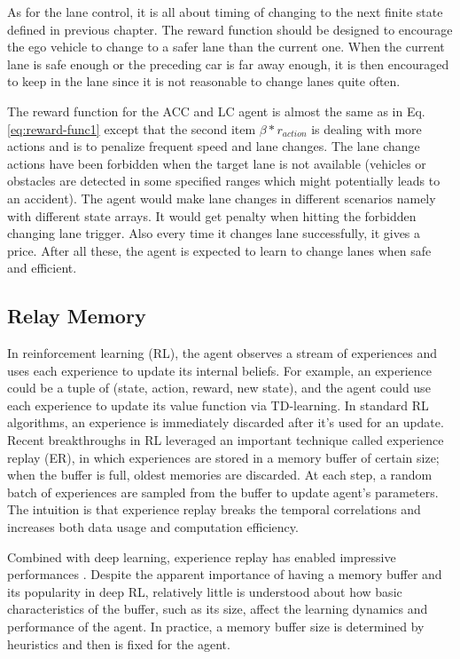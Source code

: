 As for the lane control, it is all about timing of changing to the next finite state defined in previous chapter. The reward function should be designed to encourage the ego vehicle to change to a safer lane than the current one. When the current lane is safe enough or the preceding car is far away enough, it is then encouraged to keep in the lane since it is not reasonable to change lanes quite often.

The reward function for the ACC and LC agent is almost the same as in Eq. \ref{eq:reward-func1} except that the second item $\beta *  r_{action}$ is dealing with more actions and is to penalize frequent speed and lane changes. The lane change actions have been forbidden when the target lane is not available (vehicles or obstacles are detected in some specified ranges which might potentially leads to an accident). The agent would make lane changes in different scenarios namely with different state arrays. It would get penalty when hitting the forbidden changing lane trigger. Also every time it changes lane successfully, it gives a price. After all these, the agent is expected to learn to change lanes when safe and efficient.

\subsection{Relay Memory}

In reinforcement learning (RL), the agent observes a stream of experiences and uses each experience to update its internal beliefs. For example, an experience could be a tuple of (state, action, reward, new state), and the agent could use each experience to update its value function via TD-learning. In standard RL algorithms, an experience is immediately discarded after it's used for an update. Recent breakthroughs in RL leveraged an important technique called experience replay (ER), in which experiences are stored in a memory buffer of certain size; when the buffer is full, oldest memories are discarded. At each step, a random batch of experiences are sampled from the buffer to update agent's parameters. The intuition is that experience replay breaks the temporal correlations and increases both data usage and computation efficiency.

Combined with deep learning, experience replay has enabled impressive performances \cite{Mnih2015AtariNature}. Despite the apparent importance of having a memory buffer and its popularity in deep RL, relatively little is understood about how basic characteristics of the buffer, such as its size, affect the learning dynamics and performance of the agent. In practice, a memory buffer size is determined by heuristics and then is fixed for the agent.

